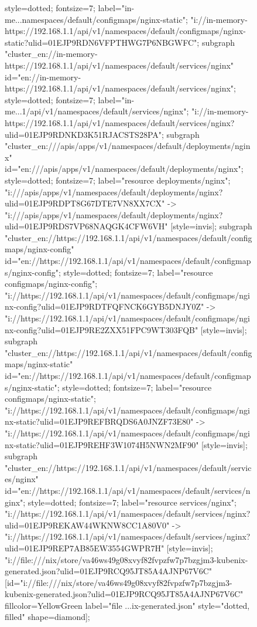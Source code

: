 \begin{figure}[p]
\begin{sideways}
{{style=dotted;
fontsize=7;
label="in-me...namespaces/default/configmaps/nginx-static";
"i://in-memory-https://192.168.1.1/api/v1/namespaces/default/configmaps/nginx-static?ulid=01EJP9RDN6VFPTHWG7P6NBGWFC";
}
subgraph "cluster_en://in-memory-https://192.168.1.1/api/v1/namespaces/default/services/nginx" {
id="en://in-memory-https://192.168.1.1/api/v1/namespaces/default/services/nginx";
style=dotted;
fontsize=7;
label="in-me...1/api/v1/namespaces/default/services/nginx";
"i://in-memory-https://192.168.1.1/api/v1/namespaces/default/services/nginx?ulid=01EJP9RDNKD3K51RJACSTS28PA";
}
subgraph "cluster_en:///apis/apps/v1/namespaces/default/deployments/nginx" {
id="en:///apis/apps/v1/namespaces/default/deployments/nginx";
style=dotted;
fontsize=7;
label="resource deployments/nginx";
"i:///apis/apps/v1/namespaces/default/deployments/nginx?ulid=01EJP9RDPT8G67DTE7VN8XX7CX" ->
"i:///apis/apps/v1/namespaces/default/deployments/nginx?ulid=01EJP9RDS7VP68NAQGK4CFW6VH"  [style=invis];
}
subgraph "cluster_en://https://192.168.1.1/api/v1/namespaces/default/configmaps/nginx-config" {
id="en://https://192.168.1.1/api/v1/namespaces/default/configmaps/nginx-config";
style=dotted;
fontsize=7;
label="resource configmaps/nginx-config";
"i://https://192.168.1.1/api/v1/namespaces/default/configmaps/nginx-config?ulid=01EJP9RDTFQFNCK6GYB5DNJY0Z" ->
"i://https://192.168.1.1/api/v1/namespaces/default/configmaps/nginx-config?ulid=01EJP9RE2ZXX51FPC9WT303FQB"  [style=invis];
}
subgraph "cluster_en://https://192.168.1.1/api/v1/namespaces/default/configmaps/nginx-static" {
id="en://https://192.168.1.1/api/v1/namespaces/default/configmaps/nginx-static";
style=dotted;
fontsize=7;
label="resource configmaps/nginx-static";
"i://https://192.168.1.1/api/v1/namespaces/default/configmaps/nginx-static?ulid=01EJP9REFBRQDS6A0JNZF73E80" ->
"i://https://192.168.1.1/api/v1/namespaces/default/configmaps/nginx-static?ulid=01EJP9REHF3W1074H5NWN2MF90"  [style=invis];
}
subgraph "cluster_en://https://192.168.1.1/api/v1/namespaces/default/services/nginx" {
id="en://https://192.168.1.1/api/v1/namespaces/default/services/nginx";
style=dotted;
fontsize=7;
label="resource services/nginx";
"i://https://192.168.1.1/api/v1/namespaces/default/services/nginx?ulid=01EJP9REKAW44WKNW8CC1A80V0" ->
"i://https://192.168.1.1/api/v1/namespaces/default/services/nginx?ulid=01EJP9REP7AB85EW3554GWPR7H" [style=invis];
}
"i://file:///nix/store/va46ws49g08xvyf82fvpzfw7p7bzgjm3-kubenix-generated.json?ulid=01EJP9RCQ95JT85A4AJNP67V6C" [id="i://file:///nix/store/va46ws49g08xvyf82fvpzfw7p7bzgjm3-kubenix-generated.json?ulid=01EJP9RCQ95JT85A4AJNP67V6C" fillcolor=YellowGreen label="file ...ix-generated.json" style="dotted, filled" shape=diamond];
}
\end{sideways}
\end{figure}
